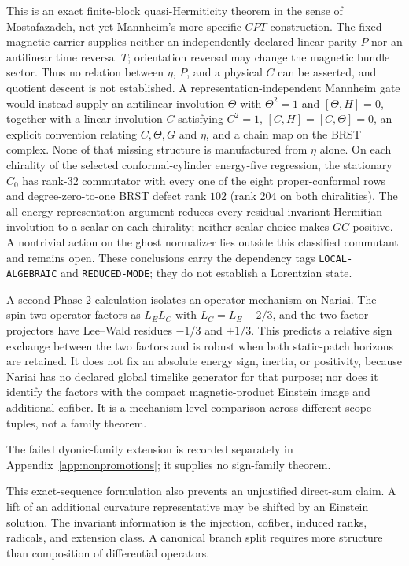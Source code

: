\documentclass[11pt]{article}
\begin{document}
This is an exact finite-block quasi-Hermiticity theorem in the sense of
Mostafazadeh, not yet Mannheim's more specific $CPT$ construction.  The
fixed magnetic carrier supplies neither an independently declared linear
parity $P$ nor an antilinear time reversal $T$; orientation reversal may
change the magnetic bundle sector.  Thus no relation between $\eta$, $P$,
and a physical $C$ can be asserted, and quotient descent is not established.
A representation-independent Mannheim gate would instead supply an
antilinear involution $\Theta$ with
\(
\Theta^2=1
\)
and $[\Theta,H]=0$, together with a linear involution $C$ satisfying
\(
C^2=1
\),
$[C,H]=[C,\Theta]=0$, an explicit convention relating $C,\Theta,G$ and
$\eta$, and a chain map on the BRST complex.  None of that missing structure
is manufactured from $\eta$ alone.
On each chirality of the selected conformal-cylinder energy-five regression,
the stationary $C_0$ has rank-$32$ commutator with every one of the eight
proper-conformal rows and degree-zero-to-one BRST defect rank $102$ (rank
$204$ on both chiralities).  The all-energy representation argument reduces
every residual-invariant Hermitian involution to a scalar on each chirality;
neither scalar choice makes $GC$ positive.  A nontrivial action on the ghost
normalizer lies outside this classified commutant and remains open.  These
conclusions carry the dependency tags \texttt{LOCAL-ALGEBRAIC} and
\texttt{REDUCED-MODE}; they do not establish a Lorentzian state.

A second Phase-2 calculation isolates an operator mechanism on Nariai.  The
spin-two operator factors as $L_E L_C$ with
$L_C=L_E-2/3$, and the two factor projectors have Lee--Wald residues
$-1/3$ and $+1/3$.  This predicts a relative sign exchange between the two
factors and is robust when both static-patch horizons are retained.  It does
not fix an absolute energy sign, inertia, or positivity, because Nariai has
no declared global timelike generator for that purpose; nor does it identify
the factors with the compact magnetic-product Einstein image and additional
cofiber.  It is a mechanism-level comparison across different scope tuples,
not a family theorem.

The failed dyonic-family extension is recorded separately in
Appendix~\ref{app:nonpromotions}; it supplies no sign-family theorem.

This exact-sequence formulation also prevents an unjustified direct-sum
claim.  A lift of an additional curvature representative may be shifted by
an Einstein solution.  The invariant information is the injection, cofiber,
induced ranks, radicals, and extension class.  A canonical branch split
requires more structure than composition of differential operators.
\end{document}
